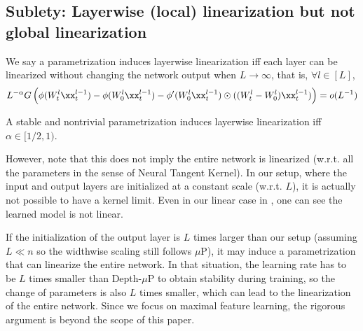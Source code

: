 \subsection{Sublety: Layerwise (local) linearization but not global linearization}

\begin{defn}\label{defn:layerwise-linearization}
    We say a parametrization induces layerwise linearization iff each layer can be linearized without changing the network output when $L\to \infty$, that is, $\forall l\in [L]$, 
    \[L^{-\alpha}G\left(\phi(W^l_t\xx_t^{l-1})-\phi( W^l_0\xx_t^{l-1}) - \phi'(W_0^l\xx_t^{l-1})\odot ((W_t^l-W_0^l)\xx_t^{l-1})\right) = o(L^{-1})\]
\end{defn}

\begin{claim}\label{clm:layerwise-linearization}
    A stable and nontrivial parametrization induces layerwise linearization iff $\alpha \in [1/2, 1)$.
\end{claim}

However, note that this does not imply the entire network is linearized (w.r.t. all the parameters in the sense of Neural Tangent Kernel).
In our setup, where the input and output layers are initialized at a constant scale (w.r.t. $L$), it is actually not possible to have a kernel limit. Even in our linear case in , one can see the learned model is not linear. 

If the initialization of the output layer is $L$ times larger than our setup (assuming $L\ll n$ so the widthwise scaling still follows $\mu$P), it may induce a parametrization that can linearize the entire network. In that situation, the learning rate has to be $L$ times smaller than Depth-$\mu$P to obtain stability during training, so the change of parameters is also $L$ times smaller, which can lead to the linearization of the entire network. Since we focus on maximal feature learning, the rigorous argument is beyond the scope of this paper.

